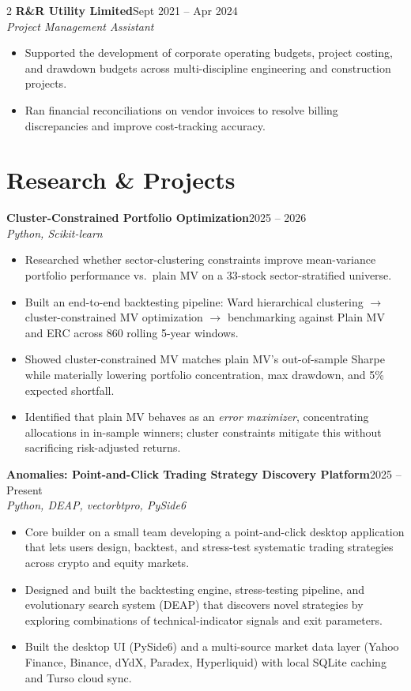 \documentclass[10pt,letterpaper]{article}
\newcommand{\role}[3]{%
  \needspace{4\baselineskip}%
  {\bfseries #1}\hfill{\color{soft}\small #3}\\
  {\color{soft}\itshape #2}\\[1pt]
}
\begin{document}
\begin{paracol}{2}
\role{R\&R Utility Limited}{Project Management Assistant}{Sept 2021 -- Apr 2024}
\begin{itemize}
  \item Supported the development of corporate operating budgets, project costing, and drawdown budgets across multi-discipline engineering and construction projects.
  \item Ran financial reconciliations on vendor invoices to resolve billing discrepancies and improve cost-tracking accuracy.
\end{itemize}

\section*{Research \& Projects}
\role{Cluster-Constrained Portfolio Optimization}{Python, Scikit-learn}{2025 -- 2026}
\begin{itemize}
  \item Researched whether sector-clustering constraints improve mean-variance portfolio performance vs.\ plain MV on a 33-stock sector-stratified universe.
  \item Built an end-to-end backtesting pipeline: Ward hierarchical clustering $\rightarrow$ cluster-constrained MV optimization $\rightarrow$ benchmarking against Plain MV and ERC across 860 rolling 5-year windows.
  \item Showed cluster-constrained MV matches plain MV's out-of-sample Sharpe while materially lowering portfolio concentration, max drawdown, and 5\% expected shortfall.
  \item Identified that plain MV behaves as an \emph{error maximizer}, concentrating allocations in in-sample winners; cluster constraints mitigate this without sacrificing risk-adjusted returns.
\end{itemize}

\role{Anomalies: Point-and-Click Trading Strategy Discovery Platform}{Python, DEAP, vectorbtpro, PySide6}{2025 -- Present}
\begin{itemize}
  \item Core builder on a small team developing a point-and-click desktop application that lets users design, backtest, and stress-test systematic trading strategies across crypto and equity markets.
  \item Designed and built the backtesting engine, stress-testing pipeline, and evolutionary search system (DEAP) that discovers novel strategies by exploring combinations of technical-indicator signals and exit parameters.
  \item Built the desktop UI (PySide6) and a multi-source market data layer (Yahoo Finance, Binance, dYdX, Paradex, Hyperliquid) with local SQLite caching and Turso cloud sync.
\end{itemize}

\end{paracol}
\end{document}
